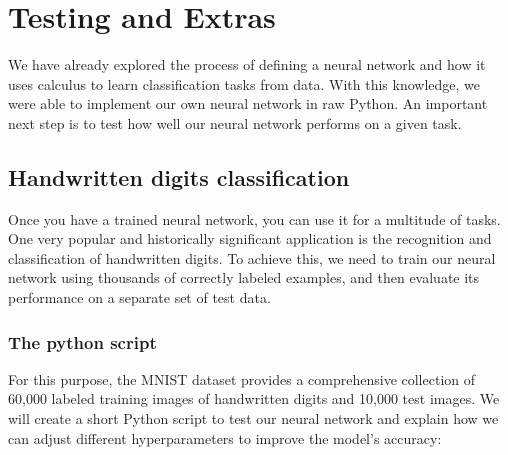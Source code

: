 \documentclass[../main]{subfiles}
\begin{document}
\chapter{Testing and Extras}

{
\hypersetup{linkcolor=black}
\minitoc
\vspace{5mm}
}

We have already explored the process of defining a neural network and how it uses calculus to learn classification tasks from data. With this knowledge, we were able to implement our own neural network in raw Python. An important next step is to test how well our neural network performs on a given task.

\section{Handwritten digits classification}
Once you have a trained neural network, you can use it for a multitude of tasks. One very popular and historically significant application is the recognition and classification of handwritten digits. To achieve this, we need to train our neural network using thousands of correctly labeled examples, and then evaluate its performance on a separate set of test data.

\subsection{The python script}
For this purpose, the MNIST dataset provides a comprehensive collection of 60,000 labeled training images of handwritten digits and 10,000 test images. We will create a short Python script to test our neural network and explain how we can adjust different hyperparameters to improve the model’s accuracy:
\end{document}
